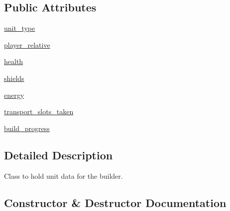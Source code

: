 \subsection*{Public Attributes}
\begin{DoxyCompactItemize}
\item 
\mbox{\hyperlink{classpysc2_1_1tests_1_1dummy__observation_1_1_unit_a2d3589a320d10ad3825139405cfdd41d}{unit\+\_\+type}}
\item 
\mbox{\hyperlink{classpysc2_1_1tests_1_1dummy__observation_1_1_unit_ad8d75d8c395e4d5cc57d7a4a22ddef0d}{player\+\_\+relative}}
\item 
\mbox{\hyperlink{classpysc2_1_1tests_1_1dummy__observation_1_1_unit_ac7b740091edb61f73123d2b4c9a4fa0e}{health}}
\item 
\mbox{\hyperlink{classpysc2_1_1tests_1_1dummy__observation_1_1_unit_a398ccdb0016e39694ff69f1d119f988d}{shields}}
\item 
\mbox{\hyperlink{classpysc2_1_1tests_1_1dummy__observation_1_1_unit_ae9c47af4d3c5ed579ae55a344f3822a6}{energy}}
\item 
\mbox{\hyperlink{classpysc2_1_1tests_1_1dummy__observation_1_1_unit_a0af1ece1cc8dd67bd225d7661852de33}{transport\+\_\+slots\+\_\+taken}}
\item 
\mbox{\hyperlink{classpysc2_1_1tests_1_1dummy__observation_1_1_unit_aea9057527f8c666711f293e3f6a77bb9}{build\+\_\+progress}}
\end{DoxyCompactItemize}


\subsection{Detailed Description}
\begin{DoxyVerb}Class to hold unit data for the builder.\end{DoxyVerb}
 

\subsection{Constructor \& Destructor Documentation}
\mbox{\label{classpysc2_1_1tests_1_1dummy__observation_1_1_unit_a4c8b7eef0f74a60b154607800a4dfcf3}} 
